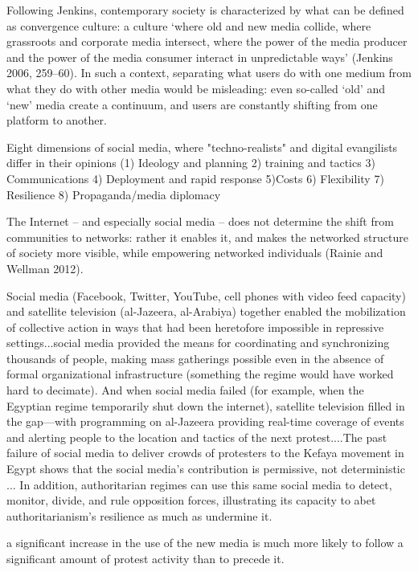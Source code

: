 		Following Jenkins, contemporary society is characterized by what can be defined as convergence culture: a culture ‘where old and new media collide, where grassroots and corporate media intersect, where the power of the media producer and the power of the media consumer interact in unpredictable ways’ (Jenkins 2006, 259–60). In such a context, separating what users do with one medium from what they do with other media would be misleading: even so-called ‘old’ and ‘new’ media create a continuum, and users are constantly shifting from one platform to another.
		
		Eight dimensions of social media, where "techno-realists" and digital evangilists differ in their opinions
		(1) Ideology and planning
		2) training and tactics
		3) Communications
		4) Deployment and rapid response
		5)Costs
		6) Flexibility
		7) Resilience
		8) Propaganda/media diplomacy
		
		The Internet – and especially social media – does not determine the shift from communities to networks: rather it enables it, and makes the networked structure of society more visible, while empowering networked individuals (Rainie and Wellman 2012).
	
	
	\cite{bellin_reconsidering_2012}
		Social media (Facebook, Twitter, YouTube, cell phones with video feed capacity) and satellite television (al-Jazeera, al-Arabiya) together enabled the mobilization of collective action in ways that had been heretofore impossible in repressive settings...social media provided the means for coordinating and synchronizing thousands of people, making mass gatherings possible even in the absence of formal organizational infrastructure (something the regime would have worked hard to decimate). And when social media failed (for example, when the Egyptian regime temporarily shut down the internet), satellite television filled in the gap—with programming on al-Jazeera providing real-time coverage of events and alerting people to the location and tactics of the next protest....The past failure of social media to deliver crowds of protesters to the Kefaya movement in Egypt shows that the social media’s contribution is permissive, not deterministic ... In addition, authoritarian regimes can use this same social media to detect, monitor, divide, and rule opposition forces, illustrating its capacity to abet authoritarianism’s resilience as much as undermine it.
	
	\citep{wolfsfeld_social_2013}
		a significant increase in the use of the new media is much more likely to follow a significant amount of protest activity than to precede it. 
	
